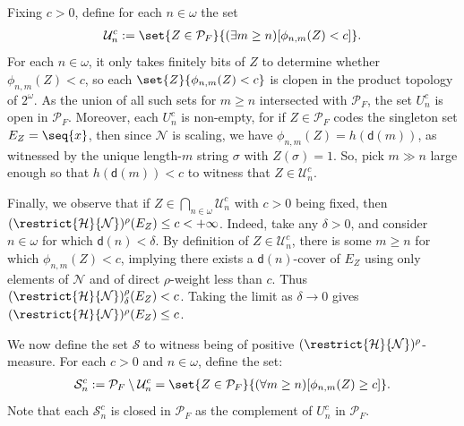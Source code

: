 Fixing $c > 0$, define for each $n \in \omega$ the set
\begin{align*}
    \mathcal{U}^c_n := \set{Z \in \mathcal{P}_F}{(\exists m \geq n)[\phi_{n, m}(Z) < c]}.
\end{align*}
For each $n \in \omega$, it only takes finitely bits of $Z$ to determine whether $\phi_{n, m}(Z) < c$, so each $\set{Z}{\phi_{n, m}(Z) < c}$ is clopen in the product topology of $2^\omega$. As the union of all such sets for $m \geq n$ intersected with $\mathcal{P}_F$, the set $U^c_n$ is open in $\mathcal{P}_F$. Moreover, each $U^c_n$ is non-empty, for if $Z \in \mathcal{P}_F$ codes the singleton set $E_Z = \seq{x}$, then since $\mathcal{N}$ is scaling, we have $\phi_{n, m}(Z) = h(\mathsf{d}(m))$, as witnessed by the unique length-$m$ string $\sigma$ with $Z(\sigma) = 1$. So, pick $m \gg n$ large enough so that $h(\mathsf{d}(m)) < c$ to witness that $Z \in \mathcal{U}^c_n$. 

Finally, we observe that if $Z \in \bigcap_{n \in \omega}\mathcal{U}^c_n$ with $c > 0$ being fixed, then $(\restrict{\mathcal{H}}{\mathcal{N}})^\rho(E_Z) \leq c < +\infty$. Indeed, take any $\delta > 0$, and consider $n \in \omega$ for which $\mathsf{d}(n) < \delta$. By definition of $Z \in \mathcal{U}^c_n$, there is some $m \geq n$ for which $\phi_{n, m}(Z) < c$, implying there exists a $\mathsf{d}(n)$-cover of $E_Z$ using only elements of $\mathcal{N}$ and of direct $\rho$-weight less than $c$. Thus $(\restrict{\mathcal{H}}{\mathcal{N}})^\rho_\delta(E_Z) < c$. Taking the limit as $\delta \to 0$ gives $(\restrict{\mathcal{H}}{\mathcal{N}})^\rho(E_Z) \leq c$.

We now define the set $\mathcal{S}$ to witness being of positive $(\restrict{\mathcal{H}}{\mathcal{N}})^\rho$-measure. 
For each $c > 0$ and $n \in \omega$, define the set:
\begin{align*}
    \mathcal{S}^c_n := \mathcal{P}_F \setminus \mathcal{U}^c_n = \set{Z \in \mathcal{P}_F}{(\forall m \geq n) [\phi_{n,m}(Z) \geq c]}.
\end{align*}
Note that each $\mathcal{S}^c_n$ is closed in $\mathcal{P}_F$ as the complement of $U^c_n$ in $\mathcal{P}_F$. 

